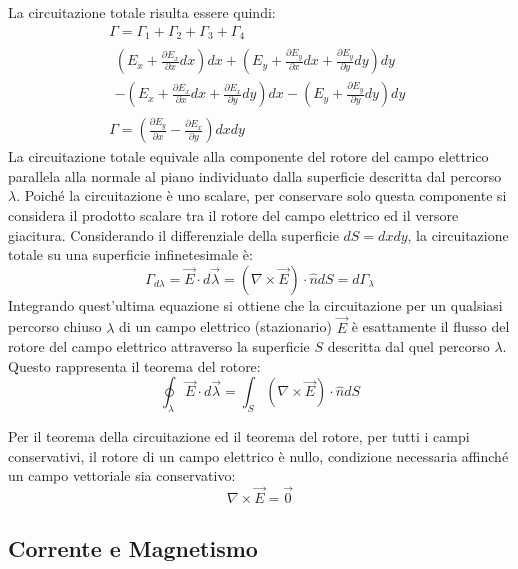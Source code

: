 \documentclass{article}
\numberwithin{equation}{subsection}
\begin{document}
La circuitazione totale risulta essere quindi:
\begin{gather*}
    \Gamma=\Gamma_1+\Gamma_2+\Gamma_3+\Gamma_4\\
    \begin{matrix}
        \displaystyle\left(E_x+\frac{\partial E_x}{\partial x}dx\right)dx+\left(E_y+\frac{\partial E_y}{\partial x}dx+\frac{\partial E_y}{\partial y}dy\right)dy\\
        \displaystyle-\left(E_x+\frac{\partial E_x}{\partial x}dx+\frac{\partial E_x}{\partial y}dy\right)dx-\left(E_y+\frac{\partial E_y}{\partial y}dy\right)dy
    \end{matrix}\\
    \Gamma=\left(\displaystyle\frac{\partial E_y}{\partial x}-\frac{\partial E_x}{\partial y}\right)dxdy
\end{gather*}
La circuitazione totale equivale alla componente del rotore del campo elettrico parallela alla normale al piano individuato dalla superficie descritta dal percorso $\lambda$. 
Poiché la circuitazione è uno scalare, per conservare solo questa componente si considera il prodotto scalare tra il rotore del campo elettrico ed il versore giacitura. 
Considerando il differenziale della superficie $dS=dxdy$, la circuitazione totale su una superficie infinetesimale è:
\begin{equation*}
    \Gamma_{d\lambda}=\vec{E}\cdot d\vec{\lambda}=({\nabla}\times\vec{E})\cdot \hat{n}dS=d\Gamma_\lambda
\end{equation*}
Integrando quest'ultima equazione si ottiene che la circuitazione per un qualsiasi percorso chiuso $\lambda$ di un campo elettrico (stazionario) $\vec{E}$ è esattamente il 
flusso del rotore del campo elettrico attraverso la superficie $S$ descritta dal quel percorso $\lambda$. Questo rappresenta il teorema del rotore: 
\begin{equation}
    \displaystyle\oint_{\lambda}\vec{E}\cdot d\vec{\lambda}=\int_S({\nabla}\times\vec{E})\cdot\hat{n}dS
\end{equation}

Per il teorema della circuitazione ed il teorema del rotore, per tutti i campi conservativi, il rotore di un campo elettrico è nullo, condizione necessaria affinché un campo 
vettoriale sia conservativo: 
\begin{equation}
    {\nabla}\times\vec{E}=\vec0
\end{equation}

\subsection{Corrente e Magnetismo}
\end{document}
